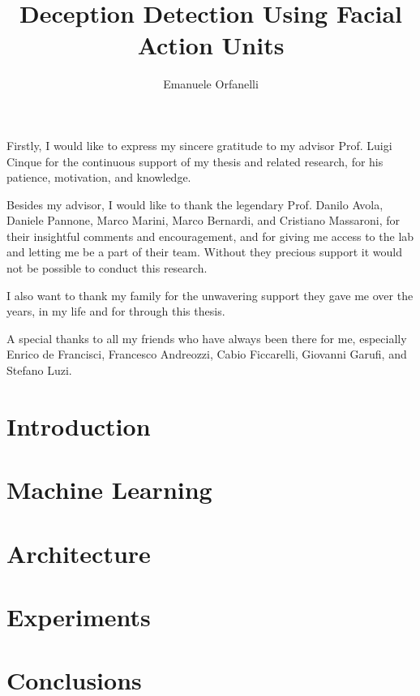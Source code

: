 \documentclass[LaM,binding=0.6cm,english,noexaminfo]{sapthesis}
\title{Deception Detection Using Facial Action Units}
\author{Emanuele Orfanelli}
\begin{document}
\frontmatter

\maketitle

\dedication{Dedicated to\\ my Family and Friends}

\begin{acknowledgments}
Firstly, I would like to express my sincere gratitude to my advisor Prof. Luigi Cinque for the continuous support of my thesis and related research, for his patience, motivation, and knowledge. 

Besides my advisor, I would like to thank the legendary Prof. Danilo Avola, Daniele Pannone, Marco Marini, Marco Bernardi, and Cristiano Massaroni, for their insightful comments and encouragement, and for giving me access to the lab and letting me be a part of their team. Without they precious support it would not be possible to conduct this research.

I also want to thank my family for the unwavering support they gave me over the years, in my life and for through this thesis.

A special thanks to all my friends who have always been there for me, especially Enrico de Francisci, Francesco Andreozzi, Cabio Ficcarelli, Giovanni Garufi, and Stefano Luzi.
\end{acknowledgments}

\tableofcontents



\mainmatter

\chapter{Introduction}


\chapter{Machine Learning} \label{tit:ml}


\chapter{Architecture} \label{tit:archi}


\chapter{Experiments} \label{tit:exp}


\chapter{Conclusions}  \label{tit:concl}


\backmatter

\printbibliography

\listoffigures

\cleardoublepage
\end{document}

